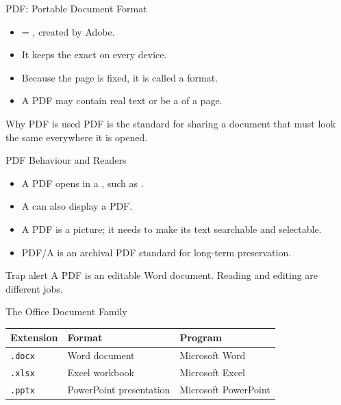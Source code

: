 \documentclass[aspectratio=169]{beamer}
\begin{document}
\begin{frame}{PDF: Portable Document Format}
  \begin{itemize}
    \item {} = , created by Adobe.
    \item It keeps the exact  on every
      device.
    \item Because the page is fixed, it is called a 
      format.
    \item A PDF may contain real text or be a  of a page.
  \end{itemize}
  \begin{block}{Why PDF is used}
    PDF is the standard for sharing a document that must look the same
    everywhere it is opened.
  \end{block}
\end{frame}

\begin{frame}{PDF Behaviour and Readers}
  \begin{itemize}
    \item A PDF opens in a , such as .
    \item A  can also display a PDF.
    \item A  PDF is a picture; it needs  to make its
      text searchable and selectable.
    \item PDF/A is an archival PDF standard for long-term preservation.
  \end{itemize}
  \begin{alertblock}{Trap alert}
    A PDF is  an editable Word document. Reading and editing are
    different jobs.
  \end{alertblock}
\end{frame}

\begin{frame}{The Office Document Family}
  \begin{center}
    \begin{tabular}{p{}p{}p{}}
      \toprule
      \textbf{Extension} & \textbf{Format} & \textbf{Program} \\
      \midrule
      \texttt{.docx} & Word document & Microsoft Word \\
      \texttt{.xlsx} & Excel workbook & Microsoft Excel \\
      \texttt{.pptx} & PowerPoint presentation & Microsoft PowerPoint \\
      \bottomrule
    \end{tabular}
  \end{center}
  \vspace{0.25cm}
\end{frame}
\end{document}
